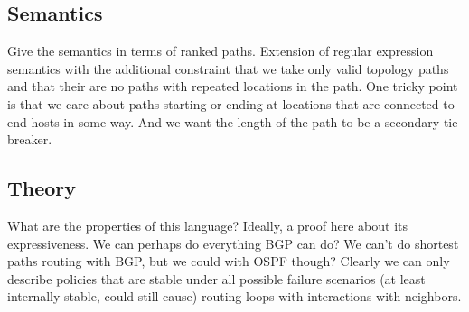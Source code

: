 \subsection{Semantics}
Give the semantics in terms of ranked paths.
Extension of regular expression semantics with the
additional constraint that we take only valid topology paths and that their are no paths with
repeated locations in the path. One tricky point is that we care about paths starting or ending at locations that are
connected to end-hosts in some way. And we want the length of the path to be a secondary tie-breaker.

\subsection{Theory}
What are the properties of this language? Ideally, a proof here about its expressiveness. We can perhaps do everything
BGP can do? We can't do shortest paths routing with BGP, but we could with OSPF though? Clearly we can only describe
policies that are stable under all possible failure scenarios (at least internally stable, could still cause) routing
loops with interactions with neighbors.


